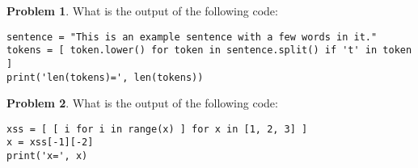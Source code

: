 \documentclass[10pt]{article}
\theoremstyle{definition}
\newtheorem{problem}{Problem}
\begin{document}
\begin{problem}
    What is the output of the following code:
\end{problem}
\begin{lstlisting}
sentence = "This is an example sentence with a few words in it."
tokens = [ token.lower() for token in sentence.split() if 't' in token ]
print('len(tokens)=', len(tokens))
\end{lstlisting}
\vspace{2.5in}

\begin{problem}
    What is the output of the following code:
\end{problem}
\begin{lstlisting}
xss = [ [ i for i in range(x) ] for x in [1, 2, 3] ]
x = xss[-1][-2]
print('x=', x)
\end{lstlisting}
\vspace{2.5in}

\end{document}

